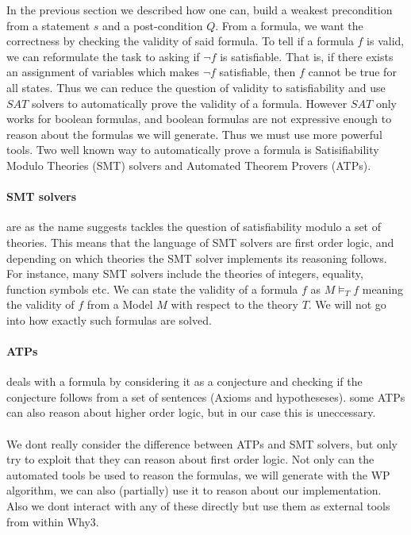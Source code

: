 In the previous section we described how one can, build a weakest precondition from a statement $s$ and a post-condition $Q$.
From a formula, we want the correctness by checking the validity of said formula.
To tell if a formula $f$ is valid, we can reformulate the task to asking if $\neg f$ is satisfiable.
That is, if there exists an assignment of variables which makes $\neg f$ satisfiable, then $f$ cannot be true
for all states.
Thus we can reduce the question of validity to satisfiability and use $SAT$ solvers to automatically prove the validity of a formula.
However $SAT$ only works for boolean formulas, and boolean formulas are not expressive enough to reason about the formulas we will generate.
Thus we must use more powerful tools. Two well known way to automatically prove a formula is Satisifiability Modulo Theories (SMT) solvers and Automated Theorem Provers (ATPs).

\paragraph{SMT solvers} are as the name suggests tackles the question of satisfiability modulo a set of theories. This means that the language of SMT solvers are first order logic, and depending on which theories the SMT solver implements its reasoning follows.
For instance, many SMT solvers include the theories of integers, equality, function symbols etc.
We can state the validity of a formula $f$ as $M \vDash_{T} f$
meaning the validity of $f$ from a Model $M$ with respect to the theory $T$.
We will not go into how exactly such formulas are solved.

\paragraph{ATPs} deals with a formula by considering it as a conjecture and checking if the conjecture follows from a set of sentences (Axioms and hypotheseses).
some ATPs can also reason about higher order logic, but in our case this is uneccessary.
\\~\\
We dont really consider the difference between ATPs and SMT solvers,
but only try to exploit that they can reason about first order logic.
Not only can the automated tools be used to reason the formulas, we will generate
with the WP algorithm, we can also (partially) use it to reason about our implementation.
Also we dont interact with any of these directly but use them as external tools from within Why3.